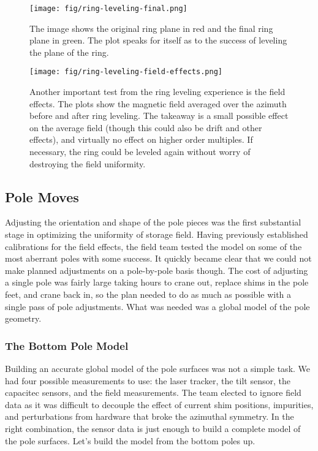 \begin{figure}
\texttt{[image: fig/ring-leveling-final.png]}
\caption{The image shows the original ring plane in red and the final ring plane in green.  The plot speaks for itself as to the success of leveling the plane of the ring.}
\label{fig:ring-leveling-final}
\end{figure}

\begin{figure}
\texttt{[image: fig/ring-leveling-field-effects.png]}
\caption{Another important test from the ring leveling experience is the field effects.  The plots show the magnetic field averaged over the azimuth before and after ring leveling.  The takeaway is a small possible effect on the average field (though this could also be drift and other effects), and virtually no effect on higher order multiples.  If necessary, the ring could be leveled again without worry of destroying the field uniformity.}
\label{fig:ring-leveling-field-effects}
\end{figure}

\subsection{Pole Moves}

Adjusting the orientation and shape of the pole pieces was the first substantial stage in optimizing the uniformity of \gmtwo storage field.  Having previously established calibrations for the field effects,  the field team tested the model on some of the most aberrant poles with some success.  It quickly became clear that we could not make planned adjustments on a pole-by-pole basis though.  The cost of adjusting a single pole was fairly large taking hours to crane out, replace shims in the pole feet, and crane back in, so the plan needed to do as much as possible with a single pass of pole adjustments.  What was needed was a global model of the pole geometry.

\subsubsection{The Bottom Pole Model}

Building an accurate global model of the pole surfaces was not a simple task.  We had four possible measurements to use: the laser tracker, the tilt sensor, the capacitec sensors, and the field measurements.  The team elected to ignore field data as it was difficult to decouple the effect of current shim positions, impurities, and perturbations from hardware that broke the azimuthal symmetry.  In the right combination, the sensor data is just enough to build a complete model of the pole surfaces.  Let's build the model from the bottom poles up.

